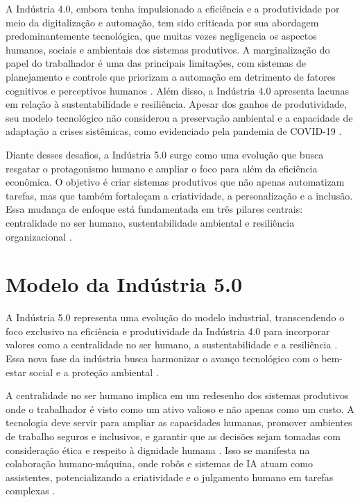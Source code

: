 A Indústria 4.0, embora tenha impulsionado a eficiência e a produtividade por meio da digitalização e automação, tem sido criticada por sua abordagem predominantemente tecnológica, que muitas vezes negligencia os aspectos humanos, sociais e ambientais dos sistemas produtivos.
A marginalização do papel do trabalhador é uma das principais limitações, com sistemas de planejamento e controle que priorizam a automação em detrimento de fatores cognitivos e perceptivos humanos \cite{RANNERTSHAUSER2022}.
Além disso, a Indústria 4.0 apresenta lacunas em relação à sustentabilidade e resiliência. Apesar dos ganhos de produtividade, seu modelo tecnológico não considerou a preservação ambiental e a capacidade de adaptação a crises sistêmicas, como evidenciado pela pandemia de COVID-19 \cite{euCommission2021, Khan2023}.

Diante desses desafios, a Indústria 5.0 surge como uma evolução que busca resgatar o protagonismo humano e ampliar o foco para além da eficiência econômica.
O objetivo é criar sistemas produtivos que não apenas automatizam tarefas, mas que também fortaleçam a criatividade, a personalização e a inclusão.
Essa mudança de enfoque está fundamentada em três pilares centrais: centralidade no ser humano, sustentabilidade ambiental e resiliência organizacional \cite{euCommission2021, Nahavandi2019}.

\section{Modelo da Indústria 5.0}

A Indústria 5.0 representa uma evolução do modelo industrial, transcendendo o foco exclusivo na eficiência e produtividade da Indústria 4.0 para incorporar valores como a centralidade no ser humano, a sustentabilidade e a resiliência \cite{euCommission2021, Xu2021}.
Essa nova fase da indústria busca harmonizar o avanço tecnológico com o bem-estar social e a proteção ambiental \cite{Nahavandi2019}.

A centralidade no ser humano implica em um redesenho dos sistemas produtivos onde o trabalhador é visto como um ativo valioso e não apenas como um custo.
A tecnologia deve servir para ampliar as capacidades humanas, promover ambientes de trabalho seguros e inclusivos, e garantir que as decisões sejam tomadas com consideração ética e respeito à dignidade humana \cite{Nahavandi2019, TOTH2023}.
Isso se manifesta na colaboração humano-máquina, onde robôs e sistemas de IA atuam como assistentes, potencializando a criatividade e o julgamento humano em tarefas complexas \cite{VALETTE2023}.


